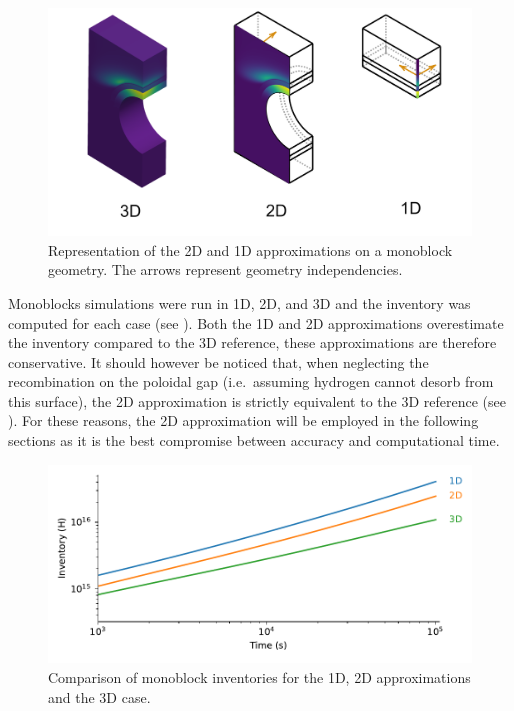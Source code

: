 \begin{figure}
    \centering
    \includegraphics[width=\linewidth]{Figures/Chapter3/monoblocks/dimension_approximation.png}
    \caption{Representation of the 2D and 1D approximations on a monoblock geometry. The arrows represent geometry independencies.}
\end{figure}

Monoblocks simulations were run in 1D, 2D, and 3D and the inventory was computed for each case (see ).
Both the 1D and 2D approximations overestimate the inventory compared to the 3D reference, these approximations are therefore conservative.
It should however be noticed that, when neglecting the recombination on the poloidal gap (i.e.\ assuming hydrogen cannot desorb from this surface), the 2D approximation is strictly equivalent to the 3D reference (see ).
For these reasons, the 2D approximation will be employed in the following sections as it is the best compromise between accuracy and computational time.

\begin{figure}
    \centering
    \includegraphics[width=\linewidth]{Figures/Chapter3/monoblocks/3D_monoblocks/comparison_inventory_1d_2d_3d.pdf}
    \caption{Comparison of monoblock inventories for the 1D, 2D approximations and the 3D case.}
\end{figure}


